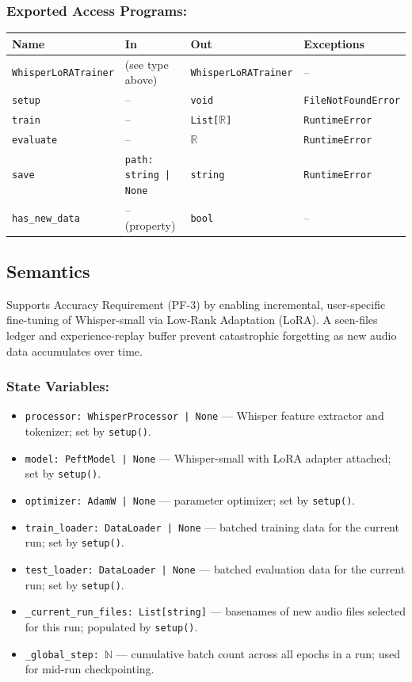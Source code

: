 \documentclass[12pt, titlepage]{article}
\begin{document}
\subsubsection{Exported Access Programs:}

\begin{tabular}{|l|l|l|l|}
\hline
\textbf{Name} & \textbf{In} & \textbf{Out} & \textbf{Exceptions} \\ \hline
\texttt{WhisperLoRATrainer} & (see type above) & \texttt{WhisperLoRATrainer} & -- \\ \hline
\texttt{setup}    & --                       & \texttt{void}         & \texttt{FileNotFoundError} \\ \hline
\texttt{train}    & --                       & \texttt{List[$\mathbb{R}$]} & \texttt{RuntimeError} \\ \hline
\texttt{evaluate} & --                       & $\mathbb{R}$          & \texttt{RuntimeError} \\ \hline
\texttt{save}     & \texttt{path: string | None} & \texttt{string}   & \texttt{RuntimeError} \\ \hline
\texttt{has\_new\_data} & -- (property)       & \texttt{bool}         & -- \\ \hline
\end{tabular}

\subsection{Semantics}

Supports Accuracy Requirement (PF-3) by enabling incremental, user-specific fine-tuning of
Whisper-small via Low-Rank Adaptation (LoRA). A seen-files ledger and experience-replay buffer
prevent catastrophic forgetting as new audio data accumulates over time.

\subsubsection{State Variables:}
\begin{itemize}
  \item \texttt{processor: WhisperProcessor | None} — Whisper feature extractor and tokenizer; set by \texttt{setup()}.
  \item \texttt{model: PeftModel | None} — Whisper-small with LoRA adapter attached; set by \texttt{setup()}.
  \item \texttt{optimizer: AdamW | None} — parameter optimizer; set by \texttt{setup()}.
  \item \texttt{train\_loader: DataLoader | None} — batched training data for the current run; set by \texttt{setup()}.
  \item \texttt{test\_loader: DataLoader | None} — batched evaluation data for the current run; set by \texttt{setup()}.
  \item \texttt{\_current\_run\_files: List[string]} — basenames of new audio files selected for this run; populated by \texttt{setup()}.
  \item \texttt{\_global\_step: $\mathbb{N}$} — cumulative batch count across all epochs in a run; used for mid-run checkpointing.
\end{itemize}
\end{document}
